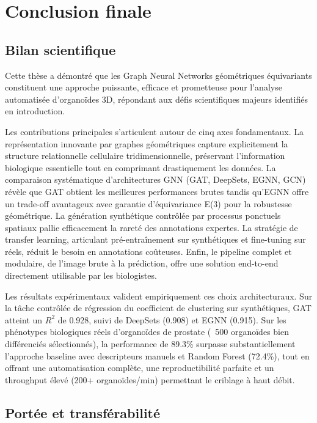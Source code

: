 \section{Conclusion finale}

\subsection{Bilan scientifique}

Cette thèse a démontré que les Graph Neural Networks géométriques équivariants constituent une approche puissante, efficace et prometteuse pour l'analyse automatisée d'organoïdes 3D, répondant aux défis scientifiques majeurs identifiés en introduction.

Les contributions principales s'articulent autour de cinq axes fondamentaux. La représentation innovante par graphes géométriques capture explicitement la structure relationnelle cellulaire tridimensionnelle, préservant l'information biologique essentielle tout en comprimant drastiquement les données. La comparaison systématique d'architectures GNN (GAT, DeepSets, EGNN, GCN) révèle que GAT obtient les meilleures performances brutes tandis qu'EGNN offre un trade-off avantageux avec garantie d'équivariance E(3) pour la robustesse géométrique. La génération synthétique contrôlée par processus ponctuels spatiaux pallie efficacement la rareté des annotations expertes. La stratégie de transfer learning, articulant pré-entraînement sur synthétiques et fine-tuning sur réels, réduit le besoin en annotations coûteuses. Enfin, le pipeline complet et modulaire, de l'image brute à la prédiction, offre une solution end-to-end directement utilisable par les biologistes.

Les résultats expérimentaux valident empiriquement ces choix architecturaux. Sur la tâche contrôlée de régression du coefficient de clustering sur synthétiques, GAT atteint un $R^2$ de 0.928, suivi de DeepSets (0.908) et EGNN (0.915). Sur les phénotypes biologiques réels d'organoïdes de prostate (~500 organoïdes bien différenciés sélectionnés), la performance de 89.3\% surpasse substantiellement l'approche baseline avec descripteurs manuels et Random Forest (72.4\%), tout en offrant une automatisation complète, une reproductibilité parfaite et un throughput élevé (200+ organoïdes/min) permettant le criblage à haut débit.

\subsection{Portée et transférabilité}

